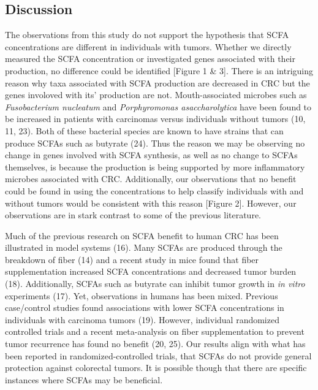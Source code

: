 \documentclass[11pt,]{article}
\begin{document}
\newpage

\subsection{Discussion}\label{discussion}

The observations from this study do not support the hypothesis that SCFA
concentrations are different in individuals with tumors. Whether we
directly measured the SCFA concentration or investigated genes
associated with their production, no difference could be identified
{[}Figure 1 \& 3{]}. There is an intriguing reason why taxa associated
with SCFA production are decreased in CRC but the genes involoved with
its' production are not. Mouth-associated microbes such as
\emph{Fusobacterium nucleatum} and \emph{Porphyromonas asaccharolytica}
have been found to be increased in patients with carcinomas versus
individuals without tumors (10, 11, 23). Both of these bacterial species
are known to have strains that can produce SCFAs such as butyrate (24).
Thus the reason we may be observing no change in genes involved with
SCFA synthesis, as well as no change to SCFAs themselves, is because the
production is being supported by more inflammatory microbes associated
with CRC. Additionally, our observations that no benefit could be found
in using the concentrations to help classify individuals with and
without tumors would be consistent with this reason {[}Figure 2{]}.
However, our observations are in stark contrast to some of the previous
literature.

Much of the previous research on SCFA benefit to human CRC has been
illustrated in model systems (16). Many SCFAs are produced through the
breakdown of fiber (14) and a recent study in mice found that fiber
supplementation increased SCFA concentrations and decreased tumor burden
(18). Additionally, SCFAs such as butyrate can inhibit tumor growth in
\emph{in vitro} experiments (17). Yet, observations in humans has been
mixed. Previous case/control studies found associations with lower SCFA
concentrations in individuals with carcinoma tumors (19). However,
individual randomized controlled trials and a recent meta-analysis on
fiber supplementation to prevent tumor recurrence has found no benefit
(20, 25). Our results align with what has been reported in
randomized-controlled trials, that SCFAs do not provide general
protection against colorectal tumors. It is possible though that there
are specific instances where SCFAs may be beneficial.
\end{document}
